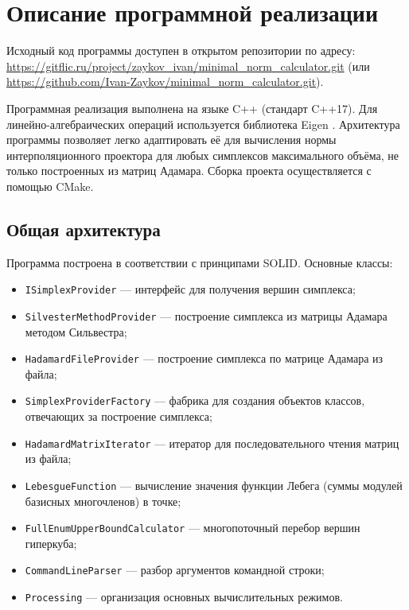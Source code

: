 \documentclass[a4paper,12pt]{article}
\theoremstyle{indented}
\begin{document}
\section{Описание программной реализации}

Исходный код программы доступен в открытом репозитории по адресу:
\url{https://gitflic.ru/project/zaykov_ivan/minimal_norm_calculator.git} (или \url{https://github.com/Ivan-Zaykov/minimal_norm_calculator.git}).

Программная реализация выполнена на языке C++ (стандарт C++17). Для линейно-алгебраических операций используется библиотека Eigen \cite{eigen_lib}. Архитектура программы позволяет легко адаптировать её для вычисления нормы интерполяционного проектора для любых симплексов максимального объёма, не только построенных из матриц Адамара. Сборка проекта осуществляется с помощью CMake.

\subsection{Общая архитектура}

Программа построена в соответствии с принципами SOLID. Основные классы:

\begin{itemize}
    \item \texttt{ISimplexProvider} — интерфейс для получения вершин симплекса;
    \item \texttt{SilvesterMethodProvider} — построение симплекса из матрицы Адамара методом Сильвестра;
    \item \texttt{HadamardFileProvider} — построение симплекса по матрице Адамара из файла;
    \item \texttt{SimplexProviderFactory} — фабрика для создания объектов классов, отвечающих за построение симплекса;
    \item \texttt{HadamardMatrixIterator} — итератор для последовательного чтения матриц из файла;
    \item \texttt{LebesgueFunction} — вычисление значения функции Лебега (суммы модулей базисных многочленов) в точке;
    \item \texttt{FullEnumUpperBoundCalculator} — многопоточный перебор вершин гиперкуба;
    \item \texttt{CommandLineParser} — разбор аргументов командной строки;
    \item \texttt{Processing} — организация основных вычислительных режимов.
\end{itemize}
\end{document}
